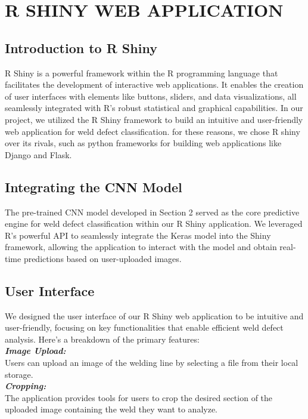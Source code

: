 \documentclass{article_saj}
\begin{document}
\section{R SHINY WEB APPLICATION}
\subsection{Introduction to R Shiny}
\indent
\indent R Shiny is a powerful framework within the R programming language that facilitates the development of interactive web applications. It enables the creation of user interfaces with elements like buttons, sliders, and data visualizations, all seamlessly integrated with R's robust statistical and graphical capabilities. In our project, we utilized the R Shiny framework to build an intuitive and user-friendly web application for weld defect classification. for these reasons, we chose R shiny over its rivals, such as python frameworks for building web applications like Django and Flask.

\subsection{Integrating the CNN Model}
\indent
\indent The pre-trained CNN model developed in Section 2 served as the core predictive engine for weld defect classification within our R Shiny application. We leveraged R's powerful API to seamlessly integrate the Keras model into the Shiny framework, allowing the application to interact with the model and obtain real-time predictions based on user-uploaded images.

\subsection{User Interface}
\indent
\indent We designed the user interface of our R Shiny web application to be intuitive and user-friendly, focusing on key functionalities that enable efficient weld defect analysis. Here's a breakdown of the primary features:\\

    \indent \textbf{\textit{Image Upload:}}\\ \indent Users can upload an image of the welding line by selecting a file from their local storage.\\
    
    \indent \textbf{\textit{Cropping:}}\\ \indent The application provides tools for users to crop the desired section of the uploaded image containing the weld they want to analyze.\\
    
\end{document}
